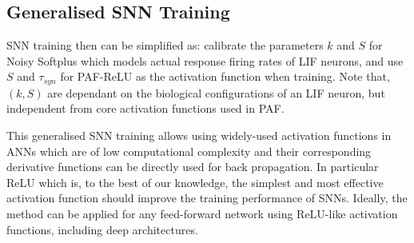 \documentclass{article}
\begin{document}
%

\subsection{Generalised SNN Training}
\label{subsec:ns_train}                                                                   SNN training then can be simplified as: calibrate the parameters $k$ and $S$ for Noisy Softplus which models actual response firing rates of LIF neurons, and use $S$ and $\tau_{syn}$ for PAF-ReLU as the activation function when training.
Note that, $(k, S)$ are dependant on the biological configurations of an LIF neuron, but independent from core activation functions used in PAF.

This generalised SNN training allows using widely-used activation functions in ANNs which are of low computational complexity and their corresponding derivative functions can be directly used for back propagation.
In particular ReLU which is, to the best of our knowledge, the simplest and most effective activation function should improve the training performance of SNNs.
Ideally, the method can be applied for any feed-forward network using ReLU-like activation functions, including deep architectures.
\end{document}
